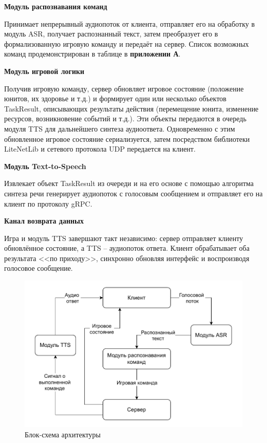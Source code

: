         \textbf{Модуль распознавания команд}
        
        Принимает непрерывный аудиопоток от клиента, отправляет его на обработку в модуль ASR, получает распознанный текст, затем преобразует его в формализованную игровую команду и передаёт на сервер. Список возможных команд продемонстрирован в таблице в \textbf{приложении А}.

        \textbf{Модуль игровой логики}

        Получив игровую команду, сервер обновляет игровое состояние (положение юнитов, их здоровье и т.д.) и формирует один или несколько объектов TaskResult, описывающих результаты действия (перемещение юнита, изменение ресурсов, возникновение событий и т.д.). Эти объекты передаются в очередь модуля TTS для дальнейшего синтеза аудиоответа. Одновременно с этим обновленное игровое состояние сериализуется, затем посредством библиотеки LiteNetLib и сетевого протокола UDP передается на клиент.

        \textbf{Модуль Text-to-Speech}
        
        Извлекает объект TaskResult из очереди и на его основе с помощью алгоритма синтеза речи генерирует аудиопоток с голосовым сообщением и отправляет его на клиент по протоколу gRPC.

        \textbf{Канал возврата данных}
        
        Игра и модуль TTS завершают такт независимо: сервер отправляет клиенту обновлённое состояние, а TTS -- аудиопоток ответа. Клиент обрабатывает оба результата <<по приходу>>, синхронно обновляя интерфейс и воспроизводя голосовое сообщение.
        

        \begin{figure}[H]
            \centering
            \includegraphics[scale=1]{pictures/architecture_scheme.pdf}
            \caption{Блок-схема архитектуры}\label{ris1.1}
        \end{figure}

